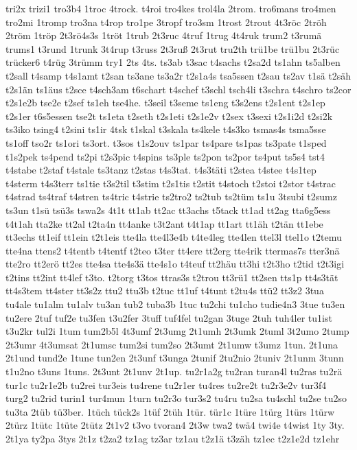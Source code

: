 {tri2x
trizi1
tro3b4
1troc
4trock.
t4roi
tro4kes
trol4la
2trom.
tro6mans
tro4men
tro2mi
1tromp
tro3na
t4rop
tro1pe
3tropf
tro3sm
1trost
2trout
4t3röc
2tröh
2tröm
1tröp
2t3rö4s3s
1tröt
1trub
2t3ruc
4truf
1trug
4t4ruk
trum2
t3rumä
trums1
t3rund
1trunk
3t4rup
t3russ
2t3ruß
2t3rut
tru2th
trü1be
trü1bu
2t3rüc
trücker6
t4rüg
3trümm
try1
2ts
4ts.
ts3ab
t3sac
t4sachs
t2sa2d
ts1ahn
ts5alben
t2sall
t4samp
t4s1amt
t2san
ts3ane
ts3a2r
t2s1a4s
tsa5ssen
t2sau
ts2av
t1sä
t2säh
t2s1än
ts1äus
t2sce
t4sch3am
t6schart
t4schef
t3schl
tsch4li
t3schra
t4schro
ts2cor
t2s1e2b
tse2e
t2sef
ts1eh
tse4he.
t3seil
t3seme
ts1eng
t3s2ens
t2s1ent
t2s1ep
t2s1er
t6s5essen
tse2t
ts1eta
t2seth
t2s1eti
t2s1e2v
t2sex
t3sexi
t2s1i2d
t2si2k
ts3iko
tsing4
t2sini
ts1ir
4tsk
t1skal
t3skala
ts4kele
t4s3ko
tsmas4s
tsma5sse
ts1off
tso2r
ts1ori
ts3ort.
t3sos
t1s2ouv
ts1par
ts4pare
ts1pas
ts3pate
t1sped
t1s2pek
ts4pend
ts2pi
t2s3pic
t4spins
ts3ple
ts2pon
ts2por
ts4put
ts5s4
tst4
t4stabe
t2staf
t4stale
ts3tanz
t2stas
t4s3tat.
t4s3täti
t2stea
t4stee
t4s1tep
t4sterm
t4s3terr
ts1tie
t3s2til
t3stim
t2s1tis
t2stit
t4stoch
t2stoi
t2stor
t4strac
t4strad
ts4traf
t4stren
ts4tric
t4strie
ts2tro2
ts2tub
ts2tüm
ts1u
3tsubi
t2sumz
ts3un
t1sü
tsü3s
tswa2s
4t1t
tt1ab
tt2ac
tt3achs
t5tack
tt1ad
tt2ag
tta6g5ess
t4t1ah
tta2ke
tt2al
t2ta4n
tt4anke
t3t2ant
t4t1ap
tt1art
tt1äh
t2tän
tt1ebe
tt3echs
tt1eif
tt1ein
t2t1eis
tte4la
tte4l3e4b
t4te4leg
tte4len
ttel3l
ttel1o
t2temu
tte4na
ttens2
t4tentb
t4tentf
t2teo
t3ter
tt4ere
tt2erg
tte4rik
ttermas7s
tter3nä
tte2ro
tt2erö
tt2es
tte4sa
tte4s3ä
tte4s1o
t4teuf
tt2häu
tt3hi
t2t3ho
t2tid
t2t3igi
t2tins
tt2int
tt4lef
t3to.
t2torg
t3tos
ttras3s
t2trou
tt3rü1
tt2sen
tts1p
tt4s3tät
tt4s3tem
tt4ster
tt3s2z
ttu2
ttu3b
t2tuc
tt1uf
t4tunt
t2tu4s
ttü2
tt3z2
3tua
tu4ale
tu1alm
tu1alv
tu3an
tub2
tuba3b
1tuc
tu2chi
tu1cho
tudie4n3
3tue
tu3en
tu2ere
2tuf
tuf2e
tu3fen
t3u2fer
3tuff
tuf4fel
tu2gan
3tuge
2tuh
tuh4ler
tu1ist
t3u2kr
tul2i
1tum
tum2b5l
4t3umf
2t3umg
2t1umh
2t3umk
2tuml
3t2umo
2tump
2t3umr
4t3umsat
2t1umsc
tum2si
tum2so
2t3umt
2t1umw
t3umz
1tun.
2t1una
2t1und
tund2e
1tune
tun2en
2t3unf
t3unga
2tunif
2tu2nio
2tuniv
2t1unm
3tunn
t1u2no
t3uns
1tuns.
2t3unt
2t1unv
2t1up.
tu2r1a2g
tu2ran
turan4l
tu2ras
tu2rä
tur1c
tu2r1e2b
tu2rei
tur3eis
tu4rene
tu2r1er
tu4res
tu2re2t
tu2r3e2v
tur3f4
turg2
tu2rid
turin1
tur4mun
1turn
tu2r3o
tur3s2
tu4ru
tu2sa
tu4schl
tu2se
tu2so
tu3ta
2tüb
tü3ber.
1tüch
tück2s
1tüf
2tüh
1tür.
tür1c
1türe
1türg
1türs
1türw
2türz
1tütc
1tüte
2tütz
2t1v2
t3vo
tvoran4
2t3w
twa2
twä4
twi4e
t4wist
1ty
3ty.
2t1ya
ty2pa
3tys
2t1z
t2za2
tz1ag
tz3ar
tz1au
t2z1ä
t3zäh
tz1ec
t2z1e2d
tz1ehr
}
